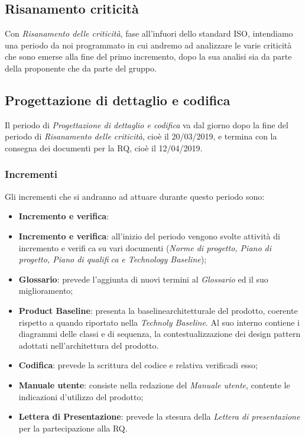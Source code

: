 \subsection{Risanamento criticità}
Con \textit{Risanamento delle criticità}, fase all'infuori dello standard ISO, intendiamo una periodo da noi programmato in cui andremo ad analizzare le varie criticità che sono emerse alla fine del primo incremento, dopo la sua analisi sia da parte della proponente che da parte del gruppo. \\

\subsection{Progettazione di dettaglio e codifica}
Il periodo di \textit{Progettazione di dettaglio e codifica} va dal giorno dopo la fine del periodo di \textit{Risanamento delle criticità}, cioè il 20/03/2019, e termina con la consegna dei documenti per la RQ, cioè il 12/04/2019.\\

\subsubsection{Incrementi}
Gli incrementi che si andranno ad attuare durante questo periodo sono:
\begin{itemize}
	\item \textbf{Incremento e verifica}: \item \textbf{Incremento e verifica}: all'inizio del periodo vengono svolte attività di incremento e verifica su vari documenti (\textit{Norme di progetto, Piano di progetto, Piano di qualifica e Technology Baseline});
	\item \textbf{Glossario}: prevede l'aggiunta di nuovi termini al \textit{Glossario} ed il suo miglioramento;
	\item \textbf{Product Baseline}\glossario: presenta la baseline\glossario architetturale del prodotto, coerente rispetto a quando riportato nella \textit{Technoly Baseline}. Al suo interno contiene i diagrammi delle classi e di sequenza, la contestualizzazione dei design pattern adottati nell'architettura del prodotto. 
	\item \textbf{Codifica}: prevede la scrittura del codice e relativa verifica\glossario di esso;
	\item \textbf{Manuale utente}: consiste nella redazione del \textit{Manuale utente}, contente le indicazioni d'utilizzo del prodotto;
	\item \textbf{Lettera di Presentazione}: prevede la stesura della \textit{Lettera di presentazione} per la partecipazione alla RQ.
\end{itemize}

